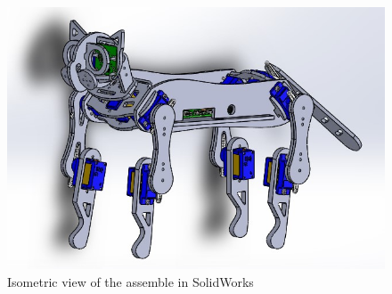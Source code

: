 \documentclass[runningheads,a4paper,12pt]{report}
\begin{document}
\begin{figure}
	\centering

  	\includegraphics[width=.6\linewidth]{./images/3_hardware}\hfill

    \caption{Isometric view of the assemble in SolidWorks}  
    \label{fig:3_hardware}
\end{figure}
\end{document}
